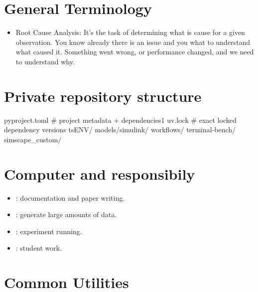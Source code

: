 \documentclass[11pt]{article}
\begin{document}
\section*{General Terminology}
\begin{itemize}
    \item Root Cause Analysis: It's the task of determining what is cause for a given observation. You know already there is an issue and you what to understand what caused it.
    Something went wrong, or performance changed, and we need to understand why.
\end{itemize}

\section*{Private repository structure}
\begin{DocCode}
pyproject.toml      # project metadata + dependencies1
uv.lock             # exact locked dependency versions
tsENV/
models/simulink/
workflows/
terminal-bench/
simscape_custom/
\end{DocCode}

\section*{Computer and responsibily}
\begin{itemize}
    \item {}: documentation and paper writing.
    \item {}: generate large amounts of data.
    \item {}: experiment running.
    \item {}: student work.
\end{itemize}



\section*{Common Utilities}
\end{document}
